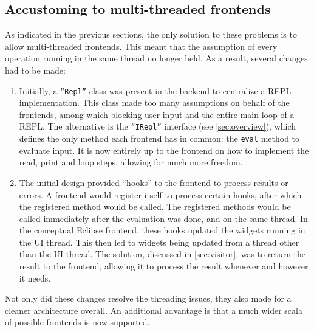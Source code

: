 \subsection{Accustoming to multi-threaded frontends}

As indicated in the previous sections, the only solution to these problems is to
allow multi-threaded frontends. This meant that the assumption of every
operation running in the same thread no longer held. As a result, several
changes had to be made:

\begin{enumerate}
  \item Initially, a \texttt{``Repl''} class was present in the backend to
  centralize a REPL implementation. This class made too many assumptions on
  behalf of the frontends, among which blocking user input and the entire main
  loop of a REPL. The alternative is the \texttt{``IRepl''} interface (see
  \cref{sec:overview}), which defines the only method each frontend has in
  common: the \texttt{eval} method to evaluate input. It is now entirely up to
  the frontend on how to implement the read, print and loop steps, allowing for
  much more freedom.
  \item	The initial design provided ``hooks'' to the frontend to process results or
  errors. A frontend would register itself to process certain hooks, after which
  the registered method would be called. The registered methods would be called
  immediately after the evaluation was done, and on the same thread. In the
  conceptual Eclipse frontend, these hooks updated the widgets running in the UI
  thread. This then led to widgets being updated from a thread other than the UI
  thread. The solution, discussed in \cref{sec:visitor}, was to return the
  result to the frontend, allowing it to process the result whenever and however
  it needs.
\end{enumerate}

Not only did these changes resolve the threading issues, they also made for a
cleaner architecture overall. An additional advantage is that a much wider scala
of possible frontends is now supported.

